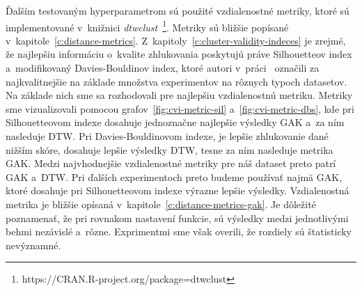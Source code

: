 \documentclass[a4paper,twoside,slovak,12pt,appendix]{article}
\begin{document}
\noindent
Ďalším testovaným hyperparametrom sú použité vzdialenostné metriky, ktoré sú
implementované v~knižnici
\textit{dtwclust}~\footnote{https://CRAN.R-project.org/package=dtwclust}.
Metriky sú bližšie popísané v~kapitole~\ref{c:distance-metrics}.
Z~kapitoly~\ref{c:cluster-validity-indeces} je zrejmé, že najlepšiu informáciu
o~kvalite zhlukovania poskytujú práve Silhouetteov index
a~modifikovaný Davies-Bouldinov index, ktoré autori v~práci~\cite{Arbelaitz2013}
označili za najkvalitnejšie na základe množstva experimentov na rôznych typoch
datasetov. Na základe nich sme sa rozhodovali pre najlepšiu vzdialenostnú
metriku. Metriky sme vizualizovali pomocou grafov~\ref{fig:cvi-metric-sil}
a~\ref{fig:cvi-metric-dbs}, kde pri Silhouetteovom indexe dosahuje jednoznačne
najlepšie výsledky GAK a~za ním nasleduje DTW. Pri Davies-Bouldinovom indexe, je
lepšie zhlukovanie dané nižším skóre, dosahuje lepšie výsledky DTW, tesne za ním
nasleduje metrika GAK. Medzi najvhodnejšie vzdialenostné metriky pre náš dataset
preto patrí GAK a~DTW. Pri ďalších experimentoch preto budeme používať najmä
GAK, ktoré dosahuje pri Silhouetteovom indexe výrazne lepšie výsledky.
Vzdialenostná metrika je bližšie opísaná
v~kapitole~\ref{c:distance-metrics-gak}. Je dôležité poznamenať, že pri rovnakom
nastavení funkcie, sú výsledky medzi jednotlivými behmi nezávislé a~rôzne.
Exprimentmi sme však overili, že rozdiely sú štatisticky nevýznamné.
\end{document}

